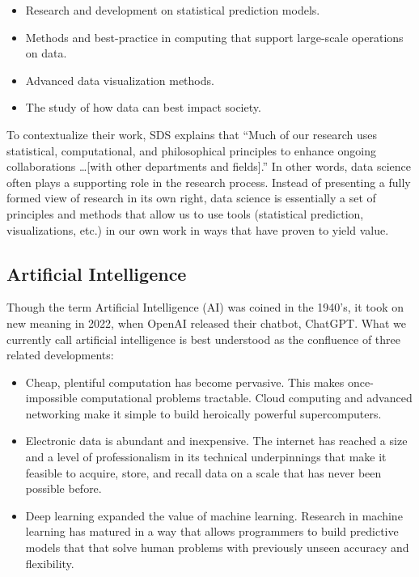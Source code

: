 \documentclass[11pt, oneside]{article}   	%
\begin{document}
\begin{itemize}
\item Research and development on statistical prediction models.
\item Methods and best-practice in computing that support large-scale operations on data.
\item Advanced data visualization methods.
\item The study of how data can best impact society.
\end{itemize}

To contextualize their work, SDS explains that “Much of our research uses statistical, computational, and philosophical principles to enhance ongoing collaborations …[with other departments and fields].”  In other words, data science often plays a supporting role in the research process.  Instead of presenting a fully formed view of research in its own right, data science is essentially a set of principles and methods that allow us to use tools (statistical prediction, visualizations, etc.) in our own work in ways that have proven to yield value.


\subsection{Artificial Intelligence}\label{section.definitions.artificial-intelligence}
Though the term Artificial Intelligence (AI) was coined in the 1940’s, it took on new meaning in 2022, when OpenAI released their chatbot, ChatGPT.  What we currently call artificial intelligence is best understood as the confluence of three related developments:

\begin{itemize}
\item Cheap, plentiful computation has become pervasive.  This makes once-impossible computational problems tractable. Cloud computing and advanced networking make it simple to build heroically powerful supercomputers.
\item Electronic data is abundant and inexpensive.  The internet has reached a size and a level of professionalism in its technical underpinnings that make it feasible to acquire, store, and recall data on a scale that has never been possible before.
\item Deep learning expanded the value of machine learning. Research in machine learning has matured in a way that allows programmers to build predictive models that that solve human problems with previously unseen accuracy and flexibility.   
\end{itemize}
\end{document}
